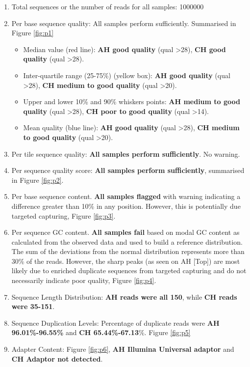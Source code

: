 \documentclass{article}
\begin{document}
\begin{enumerate}
\item Total sequences or the number of reads for all samples: 1000000
\item Per base sequence quality: All samples perform sufficiently. Summarised in Figure \ref{fig:p1}
	\begin{itemize}
	\item Median value (red line):
		 \textbf{AH good quality} (qual >28),
		 \textbf{CH good quality }(qual >28).

	\item Inter-quartile range (25-75\%) (yellow box): 
		 \textbf{AH good quality} (qual >28),
		\textbf{ CH medium to good quality}  (qual >20).

	\item Upper and lower 10\% and 90\% whiskers points:
		 \textbf{AH medium to good quality} (qual >28),
		 \textbf{CH poor to good quality} (qual >14).
	
	\item Mean quality (blue line):
		\textbf{AH good quality} (qual >28),
		\textbf{CH medium to good quality}  (qual >20).
	\end{itemize}

\item Per tile sequence quality: \textbf{All samples perform sufficiently}. No warning.
\item Per sequence quality score: \textbf{All samples perform sufficiently},  summarised in Figure \ref{fig:p2}.
\item Per base sequence content. \textbf{All samples flagged} with warning indicating 
a difference greater than 10\% in any position. However, this is potentially due targeted capturing, Figure \ref{fig:p3}.

\item Per sequence GC content. \textbf{All samples fail} based on modal GC content as calculated from the observed data and used to build a reference distribution. The sum of the deviations from the normal distribution represents more than 30\% of the reads.
However, the sharp peaks (as seen on AH [Top]) are most likely due to enriched duplicate sequences from targeted capturing and do not necessarily indicate poor quality, Figure \ref{fig:p4}.

\item Sequence Length Distribution:\textbf{ AH reads were all 150}, while \textbf{CH reads were 35-151}.
 
\item Sequence Duplication Levels: Percentage of duplicate reads were \textbf{AH 96.01\%-96.55\%} and \textbf{CH 65.44\%-67.13}\%. Figure \ref{fig:p5}

\item Adapter Content: Figure \ref{fig:p6},
	\textbf{AH Illumina Universal adaptor} and
	\textbf{CH Adaptor not detected}.
\end{enumerate}
\end{document}
